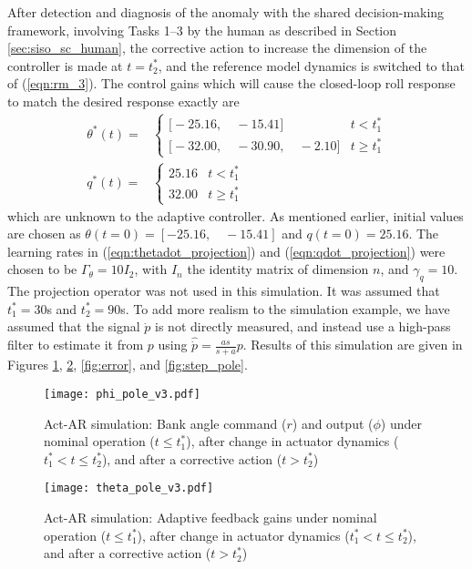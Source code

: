 After detection and diagnosis of the anomaly with the shared decision-making framework, involving Tasks 1--3 by the human as described in Section \ref{sec:siso_sc_human}, the corrective action to increase the dimension of the controller is made at $t = t_2^*$, and the reference model dynamics is switched to that of (\ref{eqn:rm_3}). The control gains which will cause the closed-loop roll response to match the desired response exactly are
\begin{align}
	\theta^*(t) = & \begin{cases}
		\Big[ -25.16, \quad -15.41 \Big] & t < t_1^* \\
		\Big[-32.00, \quad -30.90, \quad -2.10 \Big] & t \geq t_1^*
	\end{cases} \\
	q^*(t) = & \begin{cases}
		25.16 & t < t_1^* \\
		32.00 & t \geq t_1^*
	\end{cases}
\end{align}
\noindent which are unknown to the adaptive controller. As mentioned earlier, initial values are chosen as $\theta(t=0)= [-25.16, \quad -15.41]$ and $q(t=0)=25.16$. The learning rates in (\ref{eqn:thetadot_projection}) and (\ref{eqn:qdot_projection}) were chosen to be $\Gamma_\theta = 10 I_2$, with $I_n$ the identity matrix of dimension $n$, and $\gamma_q = 10$. The projection operator was not used in this simulation. It was assumed that $t_1^*=30$s and $t_2^*=90$s. To add more realism to the simulation example, we have assumed that the signal $\dot{p}$ is not directly measured, and instead use a high-pass filter to estimate it from $p$ using $\hat{\dot{p}} = \frac{as}{s+a} p$. Results of this simulation are given in Figures \ref{fig:command_and_output}, \ref{fig:theta}, \ref{fig:error}, and \ref{fig:step_pole}. 

\begin{figure}[h!]
	\centering
	\texttt{[image: phi\_pole\_v3.pdf]}
	\caption{Act-AR simulation: Bank angle command ($r$) and output ($\phi$) under nominal operation ($t \leq t_1^*$), after change in actuator dynamics ($t_1^* < t \leq t_2^*$), and after a corrective action ($t > t_2^*$)}
	\label{fig:command_and_output}
\end{figure}

\begin{figure}[h!]
	\centering
	\texttt{[image: theta\_pole\_v3.pdf]}
	\caption{Act-AR simulation: Adaptive feedback gains under nominal operation ($t \leq t_1^*$), after change in actuator dynamics ($t_1^* < t \leq t_2^*$), and after a corrective action ($t > t_2^*$)}
	\label{fig:theta}
\end{figure}

